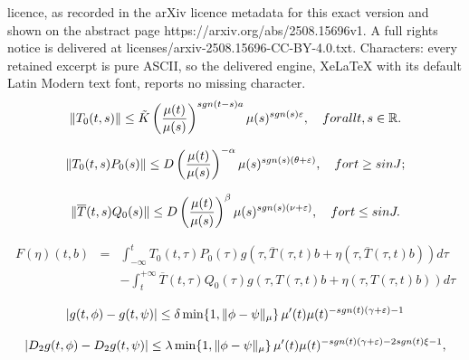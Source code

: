 \documentclass[10pt,a4paper]{amsart}
\begin{document}
licence, as recorded in the arXiv licence metadata for this exact version and shown on the abstract page https://arxiv.org/abs/2508.15696v1. A full rights notice is delivered at licenses/arxiv-2508.15696-CC-BY-4.0.txt. Characters: every retained excerpt is pure ASCII, so the delivered engine, XeLaTeX with its default Latin Modern text font, reports no missing character.
\begin{equation}\label{BG}
    \|T_0(t,s)\|\leq \tilde{K}\left(\frac{\mu(t)}{\mu(s)}\right)^{\textnormal{sgn}(t-s)a}\mu(s)^{\textnormal{sgn}(s)\varepsilon}, \quad \textnormal{ for all } t,s\in\mathbb{R}.
\end{equation}

    \begin{equation}\label{B1}
        \|T_0(t,s)P_0(s)\|\leq D\left(\frac{\mu(t)}{\mu(s)}\right)^{-\alpha}\mu(s)^{\textnormal{sgn}(s)(\theta+\varepsilon)} , \quad \textnormal{ for } t\geq s \textnormal{ in } J;
    \end{equation}

    \begin{equation}\label{B2}
         \|\overline{T}(t,s)Q_0(s)\|\leq D\left(\frac{\mu(t)}{\mu(s)}\right)^{\beta}\mu(s)^{\textnormal{sgn}(s)(\nu+\varepsilon)} , \quad \textnormal{ for } t\leq s \textnormal{ in } J.
    \end{equation}

    \begin{equation}\label{F}
        \begin{array}{rcl}
            F(\eta)(t,b) & = & \displaystyle\int_{-\infty}^{t} T_0(t,\tau)P_0(\tau)g(\tau,\overline{T}(\tau,t)b+\eta(\tau,\overline{T}(\tau,t)b))d\tau \\
             & & -\displaystyle\int_{t}^{+\infty}\overline{T}(t,\tau)Q_0(\tau)g(\tau, T(\tau,t)b+\eta(\tau,T(\tau,t)b))d\tau
        \end{array}
    \end{equation}

\begin{equation}\label{g-cond2}
    |g(t,\phi) - g(t,\psi)| \leq \delta \min\{1,\|\phi - \psi\|_{\mu}\} \, \mu'(t)\mu(t)^{-\textnormal{sgn}(t)(\gamma + \varepsilon) - 1}
\end{equation}

\begin{equation}\label{Dg-cond}
    |D_2g(t,\phi) - D_2g(t,\psi)| \leq \lambda \min\{1,\|\phi - \psi\|_{\mu}\} \, \mu'(t)\mu(t)^{-\textnormal{sgn}(t)(\gamma + \varepsilon) - 2\textnormal{sgn}(t)\xi - 1},
\end{equation}
\end{document}
